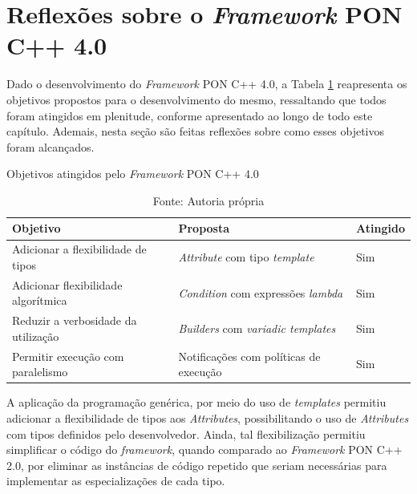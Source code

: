 
\section{Reflexões sobre o \textit{Framework} PON C++ 4.0}\label{sec:dev_reflex}

Dado o desenvolvimento do \textit{Framework} PON C++ 4.0, a Tabela
\ref{tab:obj_fw4_atingidos} reapresenta os objetivos propostos para o
desenvolvimento do mesmo, ressaltando que todos foram atingidos em plenitude,
conforme apresentado ao longo de todo este capítulo. Ademais, nesta seção são
feitas reflexões sobre como esses objetivos foram alcançados.

\begin{table}[!htb]
\centering
\caption{Objetivos atingidos pelo \textit{Framework} PON C++ 4.0}
\smallskip
\begin{tabularx}{\textwidth}{|l|X|l|}\hline
    Objetivo & Proposta & Atingido  \\\hline\hline
    Adicionar a flexibilidade de tipos & \textit{Attribute} com tipo \textit{template} & Sim \\ \hline
    Adicionar flexibilidade algorítmica & \textit{Condition} com expressões \textit{lambda} & Sim \\ \hline
    Reduzir a verbosidade da utilização & \textit{Builders} com \textit{variadic templates} & Sim \\ \hline
    Permitir execução com paralelismo & Notificações com políticas de execução & Sim \\ \hline
    \end{tabularx}
    \caption*{Fonte: Autoria própria}
    \label{tab:obj_fw4_atingidos}
\end{table}

A aplicação da programação genérica, por meio do uso de \textit{templates}
permitiu adicionar a flexibilidade de tipos aos \textit{Attributes},
possibilitando o uso de \textit{Attributes} com tipos definidos pelo
desenvolvedor. Ainda, tal flexibilização permitiu simplificar o código do
\textit{framework}, quando comparado ao \textit{Framework} PON C++ 2.0, por
eliminar as instâncias de código repetido que seriam necessárias para
implementar as especializações de cada tipo. 

